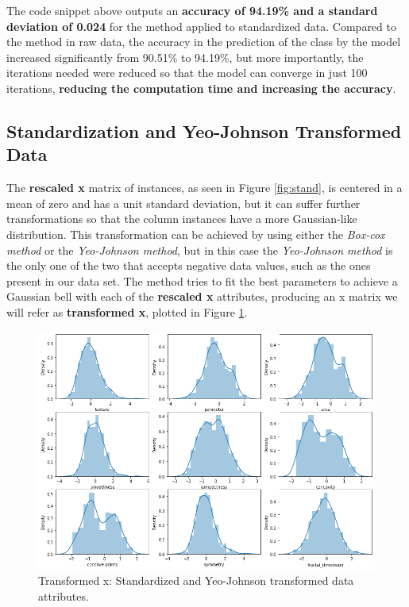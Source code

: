 \documentclass[11pt]{article}
\begin{document}
The code snippet above outputs an \textbf{accuracy of 94.19\% and a standard deviation of 0.024} for the method applied to standardized data. Compared to the method in raw data, the accuracy in the prediction of the class by the model increased significantly from 90.51\% to 94.19\%, but more importantly, the iterations needed were reduced so that the model can converge in just 100 iterations, \textbf{reducing the computation time and increasing the accuracy}. 

\subsection{Standardization and Yeo-Johnson Transformed Data}

The \textbf{rescaled x} matrix of instances, as seen in Figure \ref{fig:stand}, is centered in a mean of zero and has a unit standard deviation, but it can suffer further transformations so that the column instances have a more Gaussian-like distribution. This transformation can be achieved by using either the \textit{Box-cox method} or the \textit{Yeo-Johnson method}, but in this case the \textit{Yeo-Johnson method} is the only one of the two that accepts negative data values, such as the ones present in our data set. The method tries to fit the best parameters to achieve a Gaussian bell with each of the \textbf{rescaled x} attributes, producing an x matrix we will refer as \textbf{transformed x}, plotted in Figure \ref{fig:yeo}.
\\

\begin{figure}[!ht]
\centering
    \includegraphics[width=6in]{transformedX.png}
    \caption{Transformed x: Standardized and Yeo-Johnson transformed data attributes.}
    \label{fig:yeo}
\end{figure}
\end{document}
